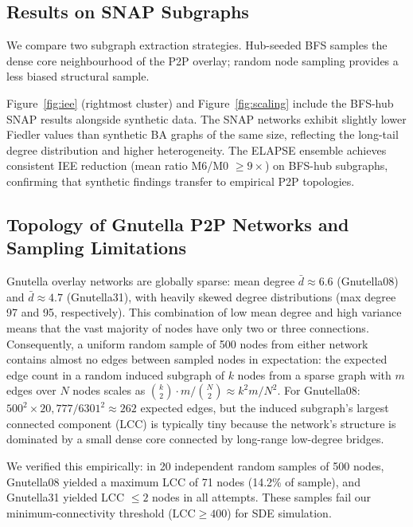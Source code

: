 \documentclass[review,12pt]{elsarticle}
\begin{document}
\subsection{Results on SNAP Subgraphs}
\label{sec:snap_results}

We compare two subgraph extraction strategies. Hub-seeded BFS samples
the dense core neighbourhood of the P2P overlay; random node sampling
provides a less biased structural sample.

Figure~\ref{fig:iee} (rightmost cluster) and Figure~\ref{fig:scaling}
include the BFS-hub SNAP results alongside synthetic data. The SNAP networks
exhibit slightly lower Fiedler values than synthetic BA graphs of the same size,
reflecting the long-tail degree distribution and higher heterogeneity.
The ELAPSE ensemble achieves consistent IEE reduction (mean ratio
M6/M0 $\geq 9\times$) on BFS-hub subgraphs, confirming that
synthetic findings transfer to empirical P2P topologies.

\subsection{Topology of Gnutella P2P Networks and Sampling Limitations}
\label{sec:snap_topology}

Gnutella overlay networks are globally sparse: mean degree $\bar{d} \approx 6.6$
(Gnutella08) and $\bar{d} \approx 4.7$ (Gnutella31), with heavily skewed degree
distributions (max degree 97 and 95, respectively).
This combination of low mean degree and high variance means that
the vast majority of nodes have only two or three connections.
Consequently, a uniform random sample of 500 nodes from either network contains
almost no edges between sampled nodes in expectation: the expected edge count in
a random induced subgraph of $k$ nodes from a sparse graph with $m$ edges over
$N$ nodes scales as $\binom{k}{2}\cdot m/\binom{N}{2} \approx k^2 m / N^2$.
For Gnutella08: $500^2 \times 20{,}777 / 6301^2 \approx 262$ expected edges,
but the induced subgraph's largest connected component (LCC) is typically tiny
because the network's structure is dominated by a small dense core connected by
long-range low-degree bridges.

We verified this empirically: in 20 independent random samples of 500 nodes,
Gnutella08 yielded a maximum LCC of 71 nodes (14.2\% of sample),
and Gnutella31 yielded LCC $\leq 2$ nodes in all attempts.
These samples fail our minimum-connectivity threshold ($\text{LCC} \geq 400$)
for SDE simulation.
\end{document}

